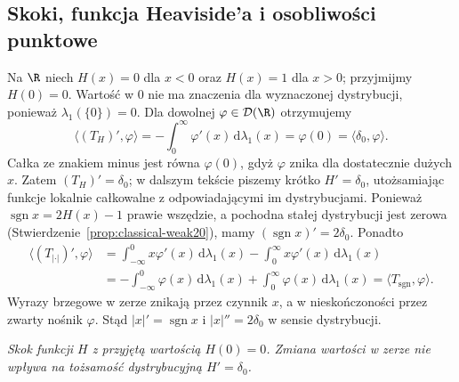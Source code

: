 \subsection{Skoki, funkcja Heaviside'a i osobliwości punktowe}

\begin{przyklad}
\label{ex:heaviside20}
Na $\R$ niech $H(x)=0$ dla $x<0$ oraz $H(x)=1$ dla $x>0$;
przyjmijmy $H(0)=0$. Wartość w $0$ nie ma znaczenia
dla wyznaczonej dystrybucji, ponieważ $\lambda_1(\{0\})=0$.
Dla dowolnej $\varphi\in\mathcal D(\R)$ otrzymujemy
\[
 \langle (T_H)',\varphi\rangle
 =-\int_0^\infty\varphi'(x)\,\mathrm d\lambda_1(x)
 =\varphi(0)=\langle\delta_0,\varphi\rangle.
\]
Całka ze znakiem minus jest równa $\varphi(0)$, gdyż $\varphi$ znika
dla dostatecznie dużych $x$.
Zatem $(T_H)'=\delta_0$; w dalszym tekście piszemy krótko
$H'=\delta_0$, utożsamiając funkcje lokalnie całkowalne
z odpowiadającymi im dystrybucjami.
Ponieważ $\operatorname{sgn}x=2H(x)-1$ prawie wszędzie,
a pochodna stałej dystrybucji jest zerowa
(Stwierdzenie~\ref{prop:classical-weak20}), mamy
$(\operatorname{sgn}x)'=2\delta_0$.
Ponadto
\[
\begin{aligned}
\langle(T_{|\cdot|})',\varphi\rangle
&=\int_{-\infty}^0 x\varphi'(x)\,\mathrm d\lambda_1(x)
 -\int_0^\infty x\varphi'(x)\,\mathrm d\lambda_1(x)\\
&=-\int_{-\infty}^0\varphi(x)\,\mathrm d\lambda_1(x)
 +\int_0^\infty\varphi(x)\,\mathrm d\lambda_1(x)
 =\langle T_{\operatorname{sgn}},\varphi\rangle .
\end{aligned}
\]
Wyrazy brzegowe w zerze znikają przez czynnik $x$,
a w nieskończoności przez zwarty nośnik $\varphi$.
Stąd $|x|'=\operatorname{sgn}x$ i $|x|''=2\delta_0$
w sensie dystrybucji.
\end{przyklad}

\begin{center}

\small\emph{Skok funkcji $H$ z przyjętą wartością $H(0)=0$.
Zmiana wartości w zerze nie wpływa na tożsamość dystrybucyjną
$H'=\delta_0$.}
\end{center}

